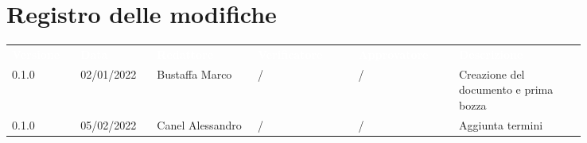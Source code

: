 \section*{Registro delle modifiche}

{\renewcommand{\arraystretch}{1.5}
\scriptsize
\begin{tabular}{p{0.10\linewidth}p{0.10\linewidth}p{0.15\linewidth}p{0.15\linewidth}p{0.15\linewidth}p{0.19\linewidth}}
	\rowcolor[RGB]{33, 73, 50}
	\textcolor{white}{\textbf{Versione}} & \textcolor{white}{\textbf{Data}} &
	\textcolor{white}{\textbf{Redattore}} & \textcolor{white}{\textbf{Verificatore}} &
	\textcolor{white}{\textbf{Approvatore}} & \textcolor{white}{\textbf{Descrizione}}\\
	\rowcolor[RGB]{216, 235, 171}
	0.1.0 & 02/01/2022 & Bustaffa Marco & / &/& Creazione del documento e prima bozza\\
	\rowcolor[RGB]{233, 245, 206}
	0.1.0 & 05/02/2022 & Canel Alessandro & / &/& Aggiunta termini\\
\end{tabular}
}
